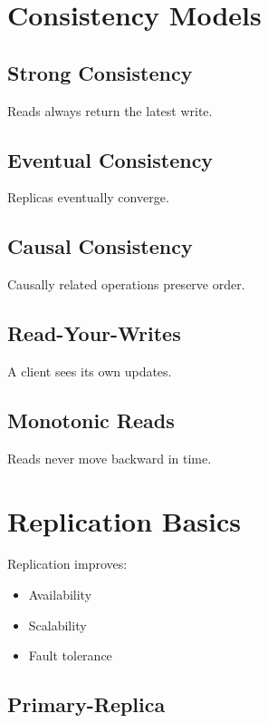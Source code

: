 \section{Consistency Models}

\subsection{Strong Consistency}

Reads always return the latest write.

\subsection{Eventual Consistency}

Replicas eventually converge.

\subsection{Causal Consistency}

Causally related operations preserve order.

\subsection{Read-Your-Writes}

A client sees its own updates.

\subsection{Monotonic Reads}

Reads never move backward in time.

\section{Replication Basics}

Replication improves:

\begin{itemize}
\item Availability
\item Scalability
\item Fault tolerance
\end{itemize}

\subsection{Primary-Replica}

